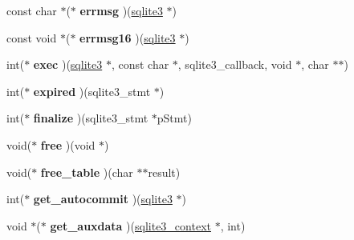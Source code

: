 \begin{DoxyCompactItemize}
\item 
const char $\ast$($\ast$ {\bfseries errmsg} )(\hyperlink{structsqlite3}{sqlite3} $\ast$)\hypertarget{structsqlite3__api__routines_a953d37f24ded9d93449f1d0eb64b8894}{}\label{structsqlite3__api__routines_a953d37f24ded9d93449f1d0eb64b8894}

\item 
const void $\ast$($\ast$ {\bfseries errmsg16} )(\hyperlink{structsqlite3}{sqlite3} $\ast$)\hypertarget{structsqlite3__api__routines_a06f862750a8e1e1b21a942cc483c4f71}{}\label{structsqlite3__api__routines_a06f862750a8e1e1b21a942cc483c4f71}

\item 
int($\ast$ {\bfseries exec} )(\hyperlink{structsqlite3}{sqlite3} $\ast$, const char $\ast$, sqlite3\+\_\+callback, void $\ast$, char $\ast$$\ast$)\hypertarget{structsqlite3__api__routines_a16e1fe4f9dccfe8da742d7087822d379}{}\label{structsqlite3__api__routines_a16e1fe4f9dccfe8da742d7087822d379}

\item 
int($\ast$ {\bfseries expired} )(sqlite3\+\_\+stmt $\ast$)\hypertarget{structsqlite3__api__routines_a574080049ce24e639e7487bcfc74e06a}{}\label{structsqlite3__api__routines_a574080049ce24e639e7487bcfc74e06a}

\item 
int($\ast$ {\bfseries finalize} )(sqlite3\+\_\+stmt $\ast$p\+Stmt)\hypertarget{structsqlite3__api__routines_ad7cee4127bfd0583ccfea40943858de2}{}\label{structsqlite3__api__routines_ad7cee4127bfd0583ccfea40943858de2}

\item 
void($\ast$ {\bfseries free} )(void $\ast$)\hypertarget{structsqlite3__api__routines_a5778783c18a96cff28a516168db77ae9}{}\label{structsqlite3__api__routines_a5778783c18a96cff28a516168db77ae9}

\item 
void($\ast$ {\bfseries free\+\_\+table} )(char $\ast$$\ast$result)\hypertarget{structsqlite3__api__routines_a16d39862f10f54f34e2d52b4da51fdac}{}\label{structsqlite3__api__routines_a16d39862f10f54f34e2d52b4da51fdac}

\item 
int($\ast$ {\bfseries get\+\_\+autocommit} )(\hyperlink{structsqlite3}{sqlite3} $\ast$)\hypertarget{structsqlite3__api__routines_a8724984acc7ccfefaa17f04a739fc396}{}\label{structsqlite3__api__routines_a8724984acc7ccfefaa17f04a739fc396}

\item 
void $\ast$($\ast$ {\bfseries get\+\_\+auxdata} )(\hyperlink{structsqlite3__context}{sqlite3\+\_\+context} $\ast$, int)\hypertarget{structsqlite3__api__routines_a1eb728229d0ff6e3bc3c5f25a4058060}{}\label{structsqlite3__api__routines_a1eb728229d0ff6e3bc3c5f25a4058060}


\end{DoxyCompactItemize}
